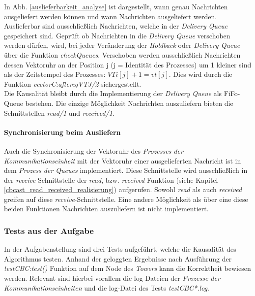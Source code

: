 In Abb. \ref{auslieferbarkeit_analyse} ist dargestellt, wann genau Nachrichten ausgeliefert werden können und wann Nachrichten ausgeliefert werden.\\
Auslieferbar sind ausschließlich Nachrichten, welche in der \textit{Delivery Queue} gespeichert sind. Geprüft ob Nachrichten in die \textit{Delivery Queue} verschoben werden dürfen, wird, bei jeder Veränderung der \textit{Holdback} oder \textit{Delivery Queue} über die Funktion \textit{checkQueues}. Verschoben werden ausschließlich Nachrichten dessen Vektoruhr an der Position j (j = Identität des Prozesses) um 1 kleiner sind als der Zeitstempel des Prozesses: $VTi[j]+1 = vt[j]$. Dies wird durch die Funktion \textit{vectorC:aftereqVTJ/2} sichergestellt.\\
Die Kausalität bleibt durch die Implementierung der \textit{Delivery Queue} als FiFo-Queue bestehen. Die einzige Möglichkeit Nachrichten auszuliefern bieten die Schnittstellen \textit{read/1} und \textit{received/1}.

\paragraph{Synchronisierung beim Ausliefern}

Auch die Synchronisierung der Vektoruhr des \textit{Prozesses der Kommunikationseinheit} mit der Vektoruhr einer ausgelieferten Nachricht ist in dem \textit{Prozess der Queues} implementiert. Diese Schnittstelle wird ausschließlich in der \textit{receive}-Schnittstelle der \textit{read}, bzw. \textit{received} Funktion (siehe Kapitel \ref{cbcast_read_received_realisierung}) aufgerufen. Sowohl \textit{read} als auch \textit{received} greifen auf diese \textit{receive}-Schnittstelle. Eine andere Möglichkeit als über eine diese beiden Funktionen Nachrichten auszuliefern ist nicht implementiert.

\subsubsection{Tests aus der Aufgabe}

In der Aufgabenstellung sind drei Tests aufgeführt, welche die Kausalität des Algorithmus testen. Anhand der geloggten Ergebnisse nach Ausführung der \textit{testCBC:test()} Funktion auf dem Node des \textit{Towers} kann die Korrektheit bewiesen werden. Relevant sind hierbei vorallem die log-Dateien der \textit{Prozesse der Kommunikationseinheiten} und die log-Datei des Tests \textit{testCBC*.log}. 

